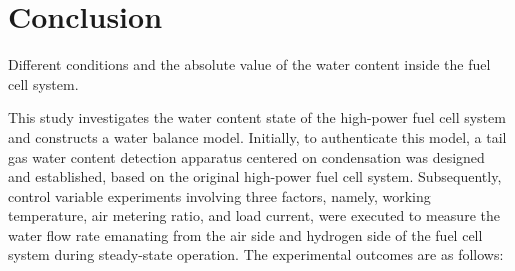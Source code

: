 \section{Conclusion}
Different conditions and the absolute value of the water content inside the fuel cell system.
\par
This study investigates the water content state of the high-power fuel cell system and constructs a water balance model. Initially, to authenticate this model, a tail gas water content detection apparatus centered on condensation was designed and established, based on the original high-power fuel cell system. Subsequently, control variable experiments involving three factors, namely, working temperature, air metering ratio, and load current, were executed to measure the water flow rate emanating from the air side and hydrogen side of the fuel cell system during steady-state operation. The experimental outcomes are as follows:
